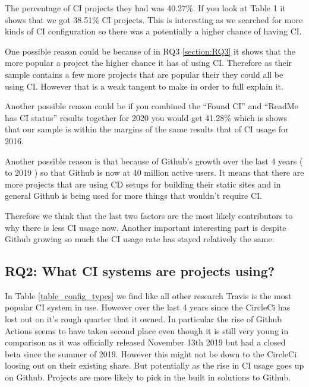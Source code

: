 \documentclass[twoside,12pt,titlepage,a4paper]{article}
\begin{document}
The percentage of CI projects they had was 40.27\%. If you look at Table 1 it shows that we got 38.51\% CI projects. This is interesting as we searched for more kinds of CI configuration so there was a potentially a higher chance of having CI.

One possible reason could be because of in RQ3 \ref{section:RQ3} it shows that the more popular a project the higher chance it has of using CI. Therefore as their sample contains a few more projects that are popular their they could all be using CI. However that is a weak tangent to make in order to full explain it.  

Another possible reason could be if you combined the \enquote{Found CI} and \enquote{ReadMe has CI status} results together for 2020 you would get 41.28\% which is shows that our sample is within the margins of the same results that of CI usage for 2016.

Another possible reason is that because of Github's growth over the last 4 years (\citet{GithubOctoverseResults2016} to 2019 \citet{GithubOctoverseResults}) so that Github is now at 40 million active users. It means that there are more projects that are using CD setups for building their static sites and in general Github is being used for more things that wouldn't require CI.

Therefore we think that the last two factors are the most likely contributors to why there is less CI usage now. Another important interesting part is despite Github growing so much the CI usage rate has stayed relatively the same. 





\vspace*{-0.05in}
\subsection{\textbf{RQ2}: What CI systems are projects using?}
\label{section:RQ2}
\vspace*{-0.05in}
In Table \ref{table_config_types} we find like all other research Travis is the most popular CI system in use. However over the last 4 years since the \cite{Github2017} CircleCi has lost out on it's rough quarter that it owned. In particular the rise of Github Actions seems to have taken second place even though it is still very young in comparison as it was officially released November 13th 2019 but had a closed beta since the summer of 2019. However this might not be down to the CircleCi loosing out on their existing share. But potentially as the rise in CI usage goes up on Github. Projects are more likely to pick in the built in solutions to Github.

\end{document}
